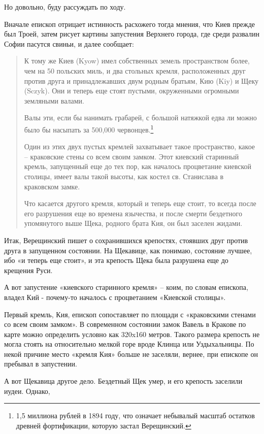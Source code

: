 Но довольно, буду рассуждать по ходу. 

Вначале епископ отрицает истинность расхожего тогда мнения, что Киев прежде был Троей, затем рисует картины запустения Верхнего города, где среди развалин Софии пасутся свиньи, и далее сообщает:

\begin{quotation}
К тому же Киев (Kyow) имел собственных земель пространством более, чем на 50 польских миль, и два стольных кремля, расположенных друг против друга и принадлежавших двум родным братьям, Кию (Kiy) и Щеку (Sczyk). Они и теперь еще стоят пустыми, окруженными огромными земляными валами.

Валы эти, если бы нанимать грабарей, с большой натяжкой едва ли можно было бы насыпать за 500,000 червонцев.\footnote{1,5 миллиона рублей в 1894 году, что означает небывалый масштаб остатков древней фортификации, которую застал Верещинский.}

Один из этих двух пустых кремлей захватывает такое пространство, какое – краковские стены со всем своим замком. Этот киевский старинный кремль, запущенный еще до тех пор, как началось процветание киевской столицы, имеет валы такой высоты, как костел св. Станислава в краковском замке.

Что касается другого кремля, который и теперь еще стоит, то всегда после его разрушения еще во времена язычества, и после смерти бездетного упомянутого выше Щека, родного брата Кия, он был заселен жидами.
\end{quotation}

Итак, Верещинский пишет о сохранившихся крепостях, стоявших друг против друга в запущенном состоянии. На Щекавице, как понимаю, состояние лучшее, ибо «и теперь еще стоит», и эта крепость Щека была разрушена еще до крещения Руси. 

А вот запустение «киевского старинного кремля» – коим, по словам епископа, владел Кий - почему-то началось с процветанием «Киевской столицы». 

Первый кремль, Кия, епископ сопоставляет по площади с «краковскими стенами со всем своим замком». В современном состоянии замок Вавель в Кракове по карте можно определить условно как 320x160 метров. Такого размера крепость не могла стоять на относительно мелкой горе вроде Клинца или Уздыхальницы. По некой причине место «кремля Кия» больше не заселяли, вернее, при епископе он пребывал в запустении.

А вот Щекавица другое дело. Бездетный Щек умер, и его крепость заселили иудеи. Однако,

